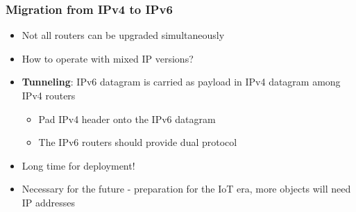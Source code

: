 \subsubsection{Migration from IPv4 to IPv6}
\begin{itemize}
	\item Not all routers can be upgraded simultaneously
	\item How to operate with mixed IP versions?
	\item \textbf{Tunneling}: IPv6 datagram is carried as payload in IPv4 datagram among IPv4 routers
	\begin{itemize}
		\item Pad IPv4 header onto the IPv6 datagram
		\item The IPv6 routers should provide dual protocol
	\end{itemize}
	\item Long time for deployment!
	\item Necessary for the future - preparation for the IoT era, more objects will need IP addresses
\end{itemize}

\pagebreak